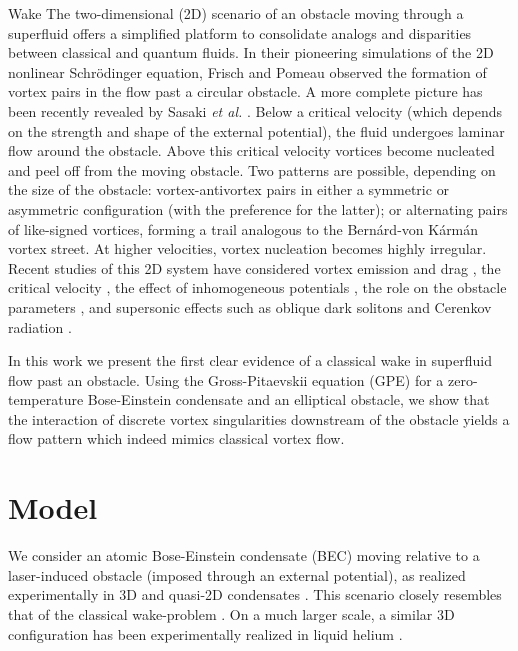 \begin{chapter}{\label{cha:wake}Wake}
The two-dimensional (2D) scenario of an obstacle moving through a superfluid offers a simplified platform to consolidate analogs and disparities between classical and quantum fluids.  In their pioneering simulations of the 2D nonlinear Schr\"odinger equation, Frisch and Pomeau \cite{frisch92} observed the formation of vortex pairs in the flow past a circular obstacle.  A more complete picture has been recently revealed by Sasaki {\it et al.} \cite{saito10}. Below a critical velocity (which depends on the strength \cite{jma00} and shape of the external potential), the fluid undergoes laminar flow around the obstacle.  Above this critical velocity vortices become nucleated and peel off from the moving obstacle. Two patterns are possible, depending on the size of the obstacle: vortex-antivortex pairs in either a symmetric \cite{frisch92} or asymmetric configuration (with the preference for the latter); or alternating pairs of like-signed vortices, forming a trail analogous to the Bern\'ard-von K\'arm\'an vortex street.  At higher velocities, vortex nucleation becomes highly irregular.  Recent studies of this 2D system have considered vortex emission and drag \cite{nore93,jma99,win00,huepe00}, the critical velocity \cite{zwerger00,crescimanno00,berloff2000,rica2001,pham2004}, the effect of inhomogeneous potentials \cite{win00,jackson98,fujimoto11}, the role on the obstacle parameters \cite{huepe00,aioi11}, and supersonic effects such as oblique dark solitons \cite{el06} and Cerenkov radiation \cite{carusotto06}.

In this work we present the first clear
evidence of a classical wake in superfluid flow past an obstacle. Using
the Gross-Pitaevskii equation (GPE) for a zero-temperature Bose-Einstein condensate and an elliptical obstacle, we 
show that the interaction of  
discrete vortex singularities downstream of the
obstacle yields a flow pattern which indeed mimics classical vortex flow.


\section{Model}

We consider an atomic Bose-Einstein condensate (BEC) moving relative to a laser-induced obstacle (imposed through 
an external potential), as realized experimentally in 3D \cite{Raman,Onofrio,Inouye,Neely} and quasi-2D condensates \cite{Neely}.  This scenario closely resembles that of the classical wake-problem \cite{taneda41,taneda112}.  On a much larger scale, a similar 
3D configuration has been experimentally realized in liquid helium 
\cite{VanSciver1999,VanSciver2005}.


\end{chapter}
